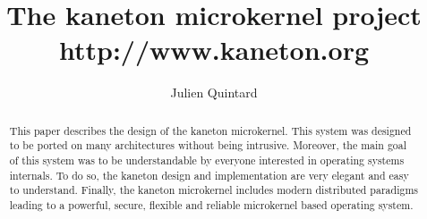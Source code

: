 
%
%



%
%


%
%

\title{The kaneton microkernel project \\
       \scriptsize{http://www.kaneton.org}}

%
%

\author{\small{Julien Quintard}}

%
%



%
%

\maketitle

%
%

\begin{abstract}

This paper describes the design of the kaneton microkernel.
This system was designed to be ported on many architectures without being
intrusive. Moreover, the main goal of this system was to be understandable
by everyone interested in operating systems internals. To do so, the kaneton
design and implementation are very elegant and easy to understand. Finally,
the kaneton microkernel includes modern distributed paradigms leading
to a powerful, secure, flexible and reliable microkernel based
operating system.

\end{abstract}

%
%

